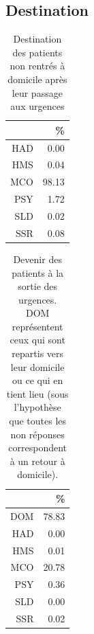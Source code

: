 \documentclass[12pt,english,french,twoside]{report}\usepackage[]{graphicx}\usepackage[]{color}
\begin{document}
\subsection{Destination}
\begin{table}[ht]
\centering
\begin{tabular}{rr}
  \hline
 & \% \\ 
  \hline
HAD & 0.00 \\ 
  HMS & 0.04 \\ 
  MCO & 98.13 \\ 
  PSY & 1.72 \\ 
  SLD & 0.02 \\ 
  SSR & 0.08 \\ 
   \hline
\end{tabular}
\caption{Destination des patients non rentrés à domicile après leur passage aux urgences} 
\label{tab.dest.hosp}
\end{table}
\begin{table}[ht]
\centering
\begin{tabular}{rr}
  \hline
 & \% \\ 
  \hline
DOM & 78.83 \\ 
  HAD & 0.00 \\ 
  HMS & 0.01 \\ 
  MCO & 20.78 \\ 
  PSY & 0.36 \\ 
  SLD & 0.00 \\ 
  SSR & 0.02 \\ 
   \hline
\end{tabular}
\caption{Devenir des patients à la sortie des urgences. DOM représentent ceux qui sont repartis vers leur domicile ou ce qui en tient lieu (sous l'hypothèse que toutes les non réponses correspondent à un retour à domicile).} 
\label{tab.dest}
\end{table}
\end{document}
